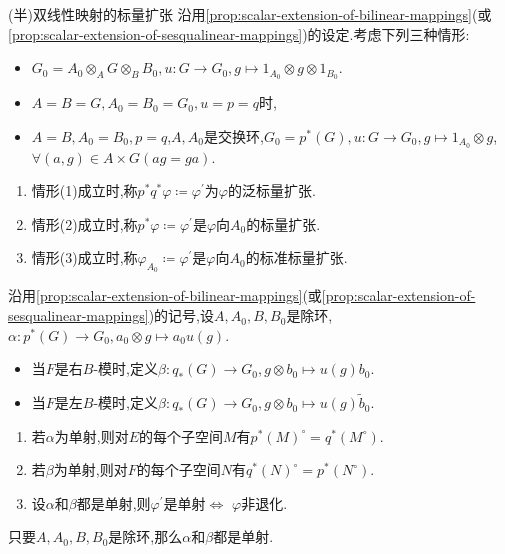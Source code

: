 \begin{definition}{(半)双线性映射的标量扩张}{}
	沿用\cref{prop:scalar-extension-of-bilinear-mappings}(或\cref{prop:scalar-extension-of-sesqualinear-mappings})的设定.考虑下列三种情形:
	\begin{itemize}
		\item $G_{0}=A_{0}\otimes_{A}G\otimes_{B}B_{0},u:G\to G_{0},g\mapsto 1_{A_{0}}\otimes g\otimes 1_{B_{0}}$.
		\item $A=B=G,A_{0}=B_{0}=G_{0},u=p=q$时,
		\item $A=B,A_{0}=B_{0},p=q$,$A,A_{0}$是交换环,$G_{0}=p^{\ast}\left(G\right),u:G\to G_{0},g\mapsto 1_{A_{0}}\otimes g$,$\forall \left(a,g\right)\in A\times G\left(ag=ga\right)$.
	\end{itemize}
	\begin{enumerate}
		\item 情形(1)成立时,称$p^{\ast}q^{\ast}\varphi\coloneq\varphi^{\prime}$为$\varphi$的泛标量扩张.
		\item 情形(2)成立时,称$p^{\ast}\varphi\coloneq\varphi^{\prime}$是$\varphi$向$A_{0}$的标量扩张.
		\item 情形(3)成立时,称$\varphi_{A_{0}}\coloneq\varphi^{\prime}$是$\varphi$向$A_{0}$的标准标量扩张.
	\end{enumerate}
\end{definition}

\begin{proposition}{}{}
	沿用\cref{prop:scalar-extension-of-bilinear-mappings}(或\cref{prop:scalar-extension-of-sesqualinear-mappings})的记号,设$A,A_{0},B,B_{0}$是除环,$\alpha:p^{\ast}\left(G\right)\to G_{0},a_{0}\otimes g\mapsto a_{0}u\left(g\right)$.
	\begin{itemize}
		\item 当$F$是右$B$-模时,定义$\beta:q_{\ast}\left(G\right)\to G_{0},g\otimes b_{0}\mapsto u\left(g\right)b_{0}$.
		\item 当$F$是左$B$-模时,定义$\beta:q_{\ast}\left(G\right)\to G_{0},g\otimes b_{0}\mapsto u\left(g\right)\tilde{b}_{0}$.
	\end{itemize}
	\begin{enumerate}
		\item 若$\alpha$为单射,则对$E$的每个子空间$M$有$p^{\ast}\left(M\right)^{\circ}=q^{\ast}\left(M^{\circ}\right)$.
		\item 若$\beta$为单射,则对$F$的每个子空间$N$有$q^{\ast}\left(N\right)^{\circ}=p^{\ast}\left(N^{\circ}\right)$.
		\item 设$\alpha$和$\beta$都是单射,则$\varphi^{\prime}$是单射$\iff$ $\varphi$非退化.
	\end{enumerate}
\end{proposition}

\begin{remark}{}{}
	只要$A,A_{0},B,B_{0}$是除环,那么$\alpha$和$\beta$都是单射.
\end{remark}
